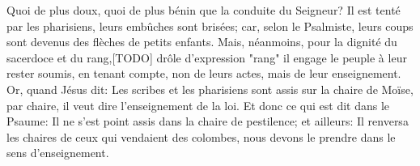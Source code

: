 Quoi de plus doux, quoi de plus bénin que la conduite du Seigneur?
	Il est tenté par les pharisiens, leurs embûches sont brisées;
	car, selon le Psalmiste,
		leurs coups sont devenus des flèches de petits enfants.
Mais, néanmoins, pour la dignité du sacerdoce et du rang,[TODO] drôle d'expression "rang"
	il engage le peuple à leur rester soumis,
	en tenant compte, non de leurs actes, mais de leur enseignement.
Or, quand Jésus dit:
	Les scribes et les pharisiens sont assis sur la chaire de Moïse,
	par chaire, il veut dire l’enseignement de la loi.
Et donc ce qui est dit dans le Psaume:
	Il ne s’est point assis dans la chaire de pestilence;
	et ailleurs: Il renversa les chaires de ceux qui vendaient des colombes,
	nous devons le prendre dans le sens d’enseignement.
